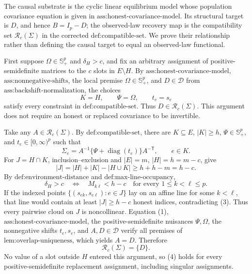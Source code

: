 The causal substrate is the cyclic linear equilibrium model whose population covariance equation is given in \(\text{ass:honest-covariance-model}\).  Its structural target is \(D\), and hence \(B=I_p-D\); the observed-law recovery map is the compatibility set \(\mathcal R_c(\Sigma)\) in the corrected \(\text{def:compatible-set}\).  We prove their relationship rather than defining the causal target to equal an observed-law functional.

First suppose \(\Omega\in\mathbb S_+^p\) and \(\delta_H>c\), and fix an arbitrary assignment of positive-semidefinite matrices to the \(c\) slots in \(E\setminus H\).  By \(\text{ass:honest-covariance-model}\), \(\text{ass:nonnegative-shifts}\), the local premise \(\Omega\in\mathbb S_+^p\), and \(D\in\mathcal D\) from \(\text{ass:backshift-normalization}\), the choices
\[
 K=H,\qquad \Psi=\Omega,\qquad t_e=s_e
\]
satisfy every constraint in \(\text{def:compatible-set}\).  Thus \(D\in\mathcal R_c(\Sigma)\).  This argument does not require an honest or replaced covariance to be invertible.

Take any \(A\in\mathcal R_c(\Sigma)\).  By \(\text{def:compatible-set}\), there are \(K\subseteq E\), \(|K|\ge h\), \(\Psi\in\mathbb S_+^p\), and \(t_e\in[0,\infty)^p\) such that
\[
 \Sigma_e=A^{-1}\{\Psi+\operatorname{diag}(t_e)\}A^{-\mathsf T},
 \qquad e\in K. \tag{1}
\]
For \(J=H\cap K\), inclusion--exclusion and \(|E|=m\), \(|H|=h=m-c\), give
\[
 |J|=|H|+|K|-|H\cup K|
 \ge h+h-m=h-c. \tag{2}
\]
By \(\text{def:environment-distance}\) and \(\text{def:max-line-occupancy}\),
\[
 \delta_H>c
 \quad\Longleftrightarrow\quad
 M_{k\ell}<h-c\quad\text{for every }1\le k<\ell\le p. \tag{3}
\]
If the indexed points \(\{(s_{ek},s_{e\ell}):e\in J\}\) lay on an affine line for some \(k<\ell\), that line would contain at least \(|J|\ge h-c\) honest indices, contradicting (3).  Thus every pairwise cloud on \(J\) is noncollinear.  Equation (1), \(\text{ass:honest-covariance-model}\), the positive-semidefinite nuisances \(\Psi,\Omega\), the nonnegative shifts \(t_e,s_e\), and \(A,D\in\mathcal D\) verify all premises of \(\text{lem:overlap-uniqueness}\), which yields \(A=D\).  Therefore
\[
 \mathcal R_c(\Sigma)=\{D\}. \tag{4}
\]
No value of a slot outside \(H\) entered this argument, so (4) holds for every positive-semidefinite replacement assignment, including singular assignments.

